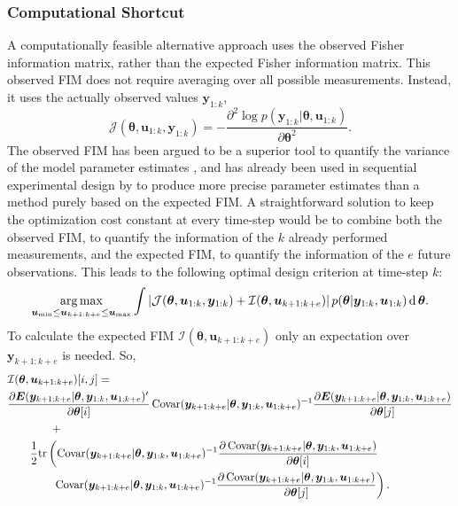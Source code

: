 \subsubsection{Computational Shortcut}
A computationally feasible alternative approach uses the observed Fisher information matrix, rather than the expected Fisher information matrix. This observed FIM does not require averaging over all possible measurements. Instead, it uses the actually observed values $\bm y_{1:k}$,
\begin{equation}
\mathcal{J}(\bm \theta,\bm u_{1:k}, \bm y_{1:k}) = 
-\frac{\partial^2 \log p(\bm y_{1:k}|\bm \theta, \bm u_{1:k})}{\partial \bm \theta^2}.
\label{observedFIM}
\end{equation}
The observed FIM has been argued to be a superior tool to quantify the variance of the model parameter estimates \parencite{efron}, and has already been used in sequential experimental design by \textcite{lane} to produce more precise parameter estimates than a method purely based on the expected FIM. A straightforward solution to keep the optimization cost constant at every time-step would be to combine both the observed FIM, to quantify the information of the $k$ already performed measurements, and the expected FIM, to quantify the information of the $e$ future observations. This leads to the following optimal design criterion at time-step $k$:
\begin{equation}
\operatorname*{arg\,max}_{\bm u_\text{min} \leq \bm u_{k+1:k+e} \leq \bm u_\text{max}} \int \left |\mathcal{J}(\bm \theta,\bm u_{1:k}, \bm y_{1:k}) + \mathcal{I}(\bm \theta,\bm u_{k+1:k+e}) \right | p(\bm \theta | \bm y_{1:k}, \bm u_{1:k}) \operatorname{\mathrm{d}} \bm \theta.
\label{adaptive bayesian optimality}
\end{equation}
To calculate the expected FIM $\mathcal{I}(\bm \theta,\bm u_{k+1:k+e})$ only an expectation over $\bm y_{k+1:k+e}$ is needed. So,
\begin{equation}
	\label{expectedFIMk}
	\begin{aligned}
		&\mathcal{I}(\bm \theta,\bm u_{k+1:k+e})[i,j]= \\
		&\frac{\partial \bm E (\bm y_{k+1:k+e}| \bm \theta, \bm y_{1:k}, \bm u_{1:k+e})'}{\partial \bm \theta[i]}
		\operatorname{\mathrm{Covar}}(\bm y_{k+1:k+e}| \bm \theta, \bm y_{1:k},\bm u_{1:k+e})^{-1}\frac{\partial \bm E (\bm y_{k+1:k+e}| \bm \theta, \bm y_{1:k},\bm u_{1:k+e})}{\partial \bm \theta[j]} \\ & \qquad \qquad + \\
		&\qquad\frac{1}{2}
		\text{tr} \left (
		\operatorname{\mathrm{Covar}}(\bm y_{k+1:k+e}| \bm \theta, \bm y_{1:k},\bm u_{1:k+e})^{-1}
		\frac{\partial \operatorname{\mathrm{Covar}}(\bm y_{k+1:k+e}| \bm \theta, \bm y_{1:k},\bm u_{1:k+e})}{\partial \bm \theta[i]} \right.\\
		&\qquad \left. \qquad\operatorname{\mathrm{Covar}}(\bm y_{k+1:k+e}| \bm \theta, \bm y_{1:k},\bm u_{1:k+e})^{-1} 
		\frac{\partial \operatorname{\mathrm{Covar}}(\bm y_{k+1:k+e}| \bm \theta, \bm y_{1:k},\bm u_{1:k+e})}{\partial \bm \theta[j]}
		\right ).
	\end{aligned}
\end{equation}
